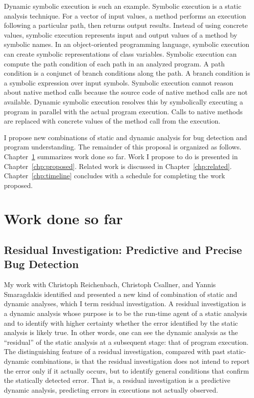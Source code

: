 \documentclass[proposal]{umthesis} %
\begin{document}
Dynamic symbolic execution\cite{Schwartz:2010:YEW:1849417.1849981} is such an example. Symbolic execution is a static analysis technique.  For a vector of input values, a method performs an execution following a particular path, then returns output results.  Instead of using concrete values, symbolic execution represents input and output values of a method by symbolic names. In an object-oriented programming language, symbolic execution can create symbolic representations of class variables. Symbolic execution can compute the path condition of each path in an analyzed program.  A path condition is a conjunct of branch conditions along the path.  A branch condition is a symbolic expression over input symbols. Symbolic execution cannot reason about native method calls because the source code of native method calls are not available.  Dynamic symbolic execution resolves this by symbolically executing a program in parallel with the actual program execution.  Calls to native methods are replaced with concrete values of the method call from the execution.  

I propose new combinations of static and dynamic analysis for bug detection and program understanding.  The remainder of this proposal is organized as follows.  Chapter~\ref{chp:worksofar} summarizes work done so far.  Work I propose to do is presented in Chapter~\ref{chp:proposed}.  Related work is discussed in Chapter~\ref{chp:related}.  Chapter~\ref{chp:timeline} concludes with a schedule for completing the work proposed.   


\chapter{Work done so far}
\label{chp:worksofar}

\section{Residual Investigation: Predictive and Precise Bug Detection}

My work\cite{rfbi-issta12} with Christoph Reichenbach, Christoph Csallner, and Yannis Smaragdakis identified and presented a new kind of combination of static and dynamic analyses, which I term residual investigation. A residual investigation is a dynamic analysis whose purpose is to be the run-time agent of a static analysis and to identify with higher certainty whether the error identified by the static analysis is likely true.  In other words, one can see the dynamic analysis as the “residual” of the static analysis at a subsequent stage: that of program execution. The distinguishing feature of a residual investigation, compared with past static-dynamic combinations, is that the residual investigation does not intend to report the error only if it actually occurs, but to identify general conditions that confirm the statically detected error. That is, a residual investigation is a predictive dynamic analysis, predicting errors in executions not actually observed.
\end{document}
